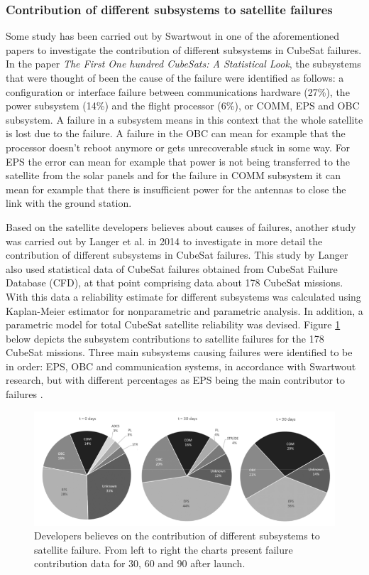 \documentclass[english,12pt,a4paper,pdftex,elec,utf8]{aaltothesis}
\begin{document}
\subsubsection{Contribution of different subsystems to satellite failures}
Some study has been carried out by Swartwout in one of the aforementioned papers to investigate the contribution of different subsystems in CubeSat failures. In the paper \textit{The First One hundred CubeSats: A Statistical Look}, the subsystems that were thought of been the cause of the failure were identified as follows: a configuration or interface failure between communications hardware (27\%), the power subsystem (14\%) and the flight processor (6\%), or COMM, EPS and OBC subsystem. A failure in a subsystem means in this context that the whole satellite is lost due to the failure. A failure in the OBC can mean for example that the processor doesn't reboot anymore or gets unrecoverable stuck in some way. For EPS the error can mean for example that power is not being transferred to the satellite from the solar panels and for the failure in COMM subsystem it can mean for example that there is insufficient power for the antennas to close the link with the ground station.  \cite{Swart1}\par
Based on the satellite developers believes about causes of failures, another study was carried out by Langer et al. in 2014 \cite{Langer} to investigate in more detail the contribution of different subsystems in CubeSat failures. This study by Langer also used statistical data of CubeSat failures obtained from CubeSat Failure Database (CFD), at that point comprising data about 178 CubeSat missions. With this data a reliability estimate for different subsystems was calculated using Kaplan-Meier estimator for nonparametric and parametric analysis. In addition, a parametric model for total CubeSat satellite reliability was devised. Figure \ref{subsystemfailures} below depicts the subsystem contributions to satellite failures for the 178 CubeSat missions. Three main subsystems causing failures were identified to be in order: EPS, OBC and communication systems, in accordance with Swartwout research, but with different percentages as EPS being the main contributor to failures \cite{Swart1}. \cite{Langer}\par
\begin{figure}[h!]
\centering
\includegraphics[scale=0.5]{langersubsystems}
\caption{Developers believes on the contribution of different subsystems to satellite failure. From left to right the charts present failure contribution data for 30, 60 and 90 after launch. \cite{Langer}}
\label{subsystemfailures}
\end{figure}  
\end{document}
